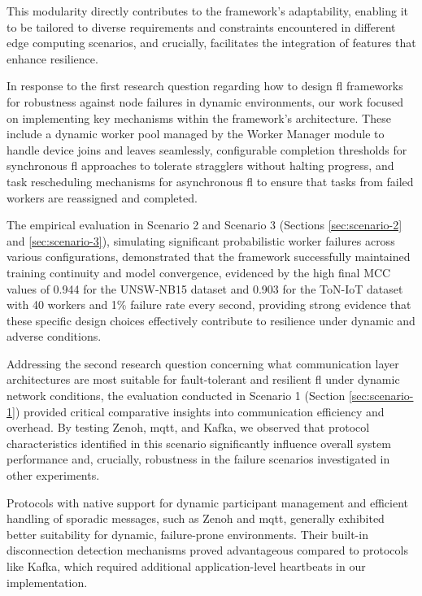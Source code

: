 This modularity directly contributes to the framework's adaptability, enabling it to be tailored to diverse requirements and constraints encountered in different edge computing scenarios, and crucially, facilitates the integration of features that enhance resilience.

In response to the first research question regarding how to design \ac{fl} frameworks for robustness against node failures in dynamic environments, our work focused on implementing key mechanisms within the framework's architecture. These include a dynamic worker pool managed by the Worker Manager module to handle device joins and leaves seamlessly, configurable completion thresholds for synchronous \ac{fl} approaches to tolerate stragglers without halting progress, and task rescheduling mechanisms for asynchronous \ac{fl} to ensure that tasks from failed workers are reassigned and completed.

The empirical evaluation in Scenario 2 and Scenario 3 (Sections \ref{sec:scenario-2} and \ref{sec:scenario-3}), simulating significant probabilistic worker failures across various configurations, demonstrated that the framework successfully maintained training continuity and model convergence, evidenced by the high final MCC values of 0.944 for the UNSW-NB15 dataset and 0.903 for the ToN-IoT dataset with 40 workers and 1\% failure rate every second, providing strong evidence that these specific design choices effectively contribute to resilience under dynamic and adverse conditions.

Addressing the second research question concerning what communication layer architectures are most suitable for fault-tolerant and resilient \ac{fl} under dynamic network conditions, the evaluation conducted in Scenario 1 (Section \ref{sec:scenario-1}) provided critical comparative insights into communication efficiency and overhead. By testing Zenoh, \ac{mqtt}, and Kafka, we observed that protocol characteristics identified in this scenario significantly influence overall system performance and, crucially, robustness in the failure scenarios investigated in other experiments.

Protocols with native support for dynamic participant management and efficient handling of sporadic messages, such as Zenoh and \ac{mqtt}, generally exhibited better suitability for dynamic, failure-prone environments. Their built-in disconnection detection mechanisms proved advantageous compared to protocols like Kafka, which required additional application-level heartbeats in our implementation. 

